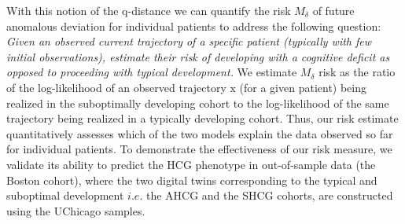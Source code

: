 \documentclass[onecolumn,10pt]{IEEEtran}
\def\x{\bm{\mathrm{x}}}
\def\qdist{q-distance\xspace}
\def\x{\bm{\mathrm{x}}}
\def\erisk{$M_\delta$\xspace}
\begin{document}
With this notion of the \qdist we can quantify  the risk \erisk of future anomalous deviation  for individual patients to address the following question: \textit{Given an observed current trajectory of a specific patient (typically with few initial observations), estimate their risk of developing with a cognitive deficit as opposed to proceeding with typical  development.} We estimate \erisk risk as the ratio of the log-likelihood of an observed trajectory $\x$ (for a given patient) being realized in the suboptimally developing cohort to the log-likelihood of the same trajectory being realized in a typically developing cohort. Thus, our risk estimate quantitatively assesses which of the two models explain the data observed so far for individual patients. To demonstrate the effectiveness of our risk measure, we  validate its ability to predict the HCG phenotype in out-of-sample data (the Boston cohort), where the two digital twins corresponding to the typical and suboptimal development $i.e.$ the AHCG and the SHCG cohorts, are constructed using the UChicago samples. 
\end{document}
